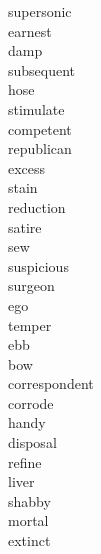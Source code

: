 \documentclass[a4paper, 11pt]{ctexart}
\begin{document}
\begin{multicols*}{3}
\begin{description}
\item[supersonic]

\item[earnest]

\item[damp]

\item[subsequent]

\item[hose]

\item[stimulate]

\item[competent]

\item[republican]

\item[excess]

\item[stain]

\item[reduction]

\item[satire]

\item[sew]

\item[suspicious]

\item[surgeon]

\item[ego]

\item[temper]

\item[ebb]

\item[bow]

\item[correspondent]

\item[corrode]

\item[handy]

\item[disposal]

\item[refine]

\item[liver]

\item[shabby]

\item[mortal]

\item[extinct]


\end{description}
\end{multicols*}
\end{document}
